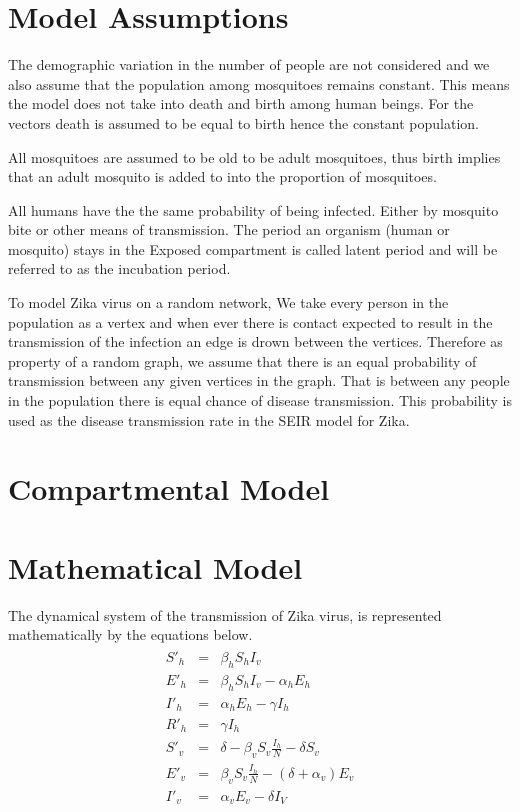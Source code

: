 \section{ Model Assumptions}



The demographic variation in the number of people are not considered  and we also assume that the population among mosquitoes remains constant. This means the model does not take into death and birth among human beings. For the vectors death is assumed to be equal to birth hence the constant population. 

All mosquitoes are assumed to be old to be adult mosquitoes, thus birth implies that an adult mosquito is added to into the proportion of mosquitoes.

All humans have the the same probability of being infected. Either by mosquito bite or other means of  transmission. The period an organism (human or mosquito) stays in the Exposed compartment is called latent period and will be referred to as the incubation period.

To model Zika virus on a random network, We take every person in the population as a vertex and when ever there is contact expected to result in the transmission of the  infection an edge is drown between the vertices. Therefore as property of a random graph, we assume that there is an equal probability of transmission between any given vertices in the graph. That is between any people in the population there is equal chance of disease transmission. This probability is used as the disease transmission rate in the SEIR model for Zika.

\section{Compartmental Model}

\section{Mathematical Model}

The dynamical system of the transmission of Zika virus, is represented mathematically by the equations below.
\begin{align}
\begin{array}{lcl}  S'_h & = &\beta_h S_h I_v  \\ E'_h & = & \beta_h S_h I_v - \alpha_h E_h  
\\ I'_h &= &\alpha_h E_h - \gamma I_h 
\\ R'_h &=& \gamma I_h 
\\ 
S'_v &=& \delta -\beta_v S_v \frac{I_h}{N} - \delta S_v
\\ E'_v & = & \beta_v S_v \frac{I_h}{N} - (\delta + \alpha_v) E_v
\\ I'_v & = &\alpha_v E_v - \delta I_V
 \end{array}
\end{align}
